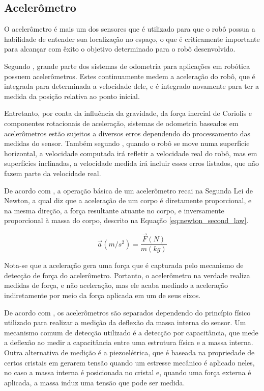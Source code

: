 \documentclass[acronym, symbols, table, deposito]{fei}
\begin{document}
			\subsection{Acelerômetro} \label{sec:sensores_acelerometro}
			
				O acelerômetro é mais um dos sensores que é utilizado para que o robô possua a habilidade de entender sua localização no espaço, o que é criticamente importante para alcançar com êxito o objetivo determinado para o robô desenvolvido.
			
				Segundo \textcite{NISTLER2011413}, grande parte dos sistemas de odometria para aplicações em robótica possuem acelerômetros. Estes continuamente medem a aceleração do robô, que é integrada para determinada a velocidade dele, e é integrado novamente para ter a medida da posição relativa ao ponto inicial.
				
				Entretanto, por conta da influência da gravidade, da força inercial de Coriolis \cite{persson1998we} e componentes rotacionais de aceleração, sistemas de odometria baseados em acelerômetros estão sujeitos a diversos erros dependendo do processamento das medidas do sensor. Também segundo \textcite{NISTLER2011413}, quando o robô se move numa superfície horizontal, a velocidade computada irá refletir a velocidade real do robô, mas em superfícies inclinadas, a velocidade medida irá incluir esses erros listados, que não fazem parte da velocidade real.
			
				De acordo com \textcite{dadafshar2014accelerometer}, a operação básica de um acelerômetro recai na Segunda Lei de Newton, a qual diz que a aceleração de um corpo é diretamente proporcional, e na mesma direção, a força resultante atuante no corpo, e inversamente proporcional à massa do corpo, descrito na Equação \eqref{eq:newton_second_law}.
				
				\begin{equation}\label{eq:newton_second_law}
					\overrightarrow{a}(m/s^2) = \frac{\overrightarrow{F}(N)}{m(kg)}
				\end{equation}
			
				Nota-se que a aceleração gera uma força que é capturada pelo mecanismo de detecção de força do acelerômetro. Portanto, o acelerômetro na verdade realiza medidas de força, e não aceleração, mas ele acaba medindo a aceleração indiretamente por meio da força aplicada em um de seus eixos.
				
				De acordo com \textcite{siegwart2011introduction}, os acelerômetros são separados dependendo do princípio físico utilizado para realizar a medição da deflexão da massa interna do sensor. Um mecanismo comum de detecção utilizado é a detecção por capacitância, que mede a deflexão ao medir a capacitância entre uma estrutura física e a massa interna. Outra alternativa de medição é a piezoelétrica, que é baseada na propriedade de certos cristais em gerarem tensão quando um estresse mecânico é aplicado neles, no caso a massa interna é posicionada no cristal e, quando uma força externa é aplicada, a massa induz uma tensão que pode ser medida.
				
\end{document}
